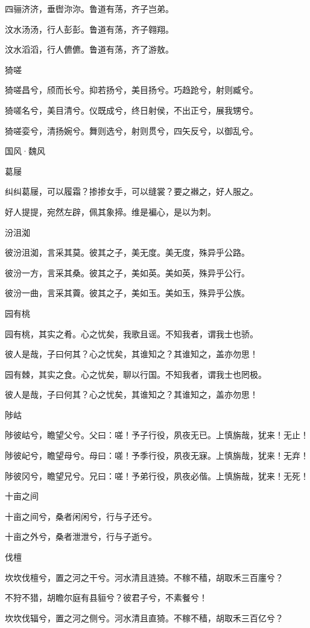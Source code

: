 四骊济济，垂辔沵沵。鲁道有荡，齐子岂弟。

汶水汤汤，行人彭彭。鲁道有荡，齐子翱翔。

汶水滔滔，行人儦儦。鲁道有荡，齐了游敖。

猗嗟

猗嗟昌兮，颀而长兮。抑若扬兮，美目扬兮。巧趋跄兮，射则臧兮。

猗嗟名兮，美目清兮。仪既成兮，终日射侯，不出正兮，展我甥兮。

猗嗟娈兮，清扬婉兮。舞则选兮，射则贯兮，四矢反兮，以御乱兮。




国风·魏风


葛屦

纠纠葛屦，可以履霜？掺掺女手，可以缝裳？要之襋之，好人服之。

好人提提，宛然左辟，佩其象揥。维是褊心，是以为刺。

汾沮洳

彼汾沮洳，言采其莫。彼其之子，美无度。美无度，殊异乎公路。

彼汾一方，言采其桑。彼其之子，美如英。美如英，殊异乎公行。

彼汾一曲，言采其藚。彼其之子，美如玉。美如玉，殊异乎公族。

园有桃

园有桃，其实之肴。心之忧矣，我歌且谣。不知我者，谓我士也骄。

彼人是哉，子曰何其？心之忧矣，其谁知之？其谁知之，盖亦勿思！

园有棘，其实之食。心之忧矣，聊以行国。不知我者，谓我士也罔极。

彼人是哉，子曰何其？心之忧矣，其谁知之？其谁知之，盖亦勿思！

陟岵

陟彼岵兮，瞻望父兮。父曰：嗟！予子行役，夙夜无已。上慎旃哉，犹来！无止！

陟彼屺兮，瞻望母兮。母曰：嗟！予季行役，夙夜无寐。上慎旃哉，犹来！无弃！

陟彼冈兮，瞻望兄兮。兄曰：嗟！予弟行役，夙夜必偕。上慎旃哉，犹来！无死！

十亩之间

十亩之间兮，桑者闲闲兮，行与子还兮。

十亩之外兮，桑者泄泄兮，行与子逝兮。

伐檀

坎坎伐檀兮，置之河之干兮。河水清且涟猗。不稼不穑，胡取禾三百廛兮？

不狩不猎，胡瞻尔庭有县貆兮？彼君子兮，不素餐兮！

坎坎伐辐兮，置之河之侧兮。河水清且直猗。不稼不穑，胡取禾三百亿兮？

